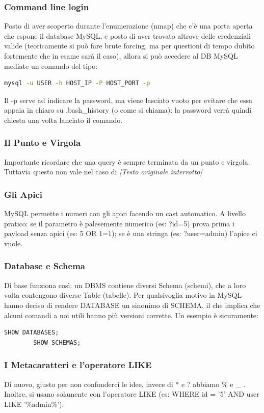 \documentclass[12pt,a4paper]{report}
\begin{document}
	\subsubsection{Command line login}
	Posto di aver scoperto durante l'enumerazione (nmap) che c'è una porta aperta che espone il database MySQL, e posto di aver trovato altrove delle credenziali valide (teoricamente si può fare brute forcing, ma per questioni di tempo dubito fortemente che in esame sarà il caso), allora si può accedere al DB MySQL mediate un comando del tipo:
	\begin{lstlisting}[language=bash]
		mysql -u USER -h HOST_IP -P HOST_PORT -p
	\end{lstlisting}
	Il -p serve ad indicare la password, ma viene lasciato vuoto per evitare che essa appaia in chiaro su .bash\_history (o come si chiama): la password verrà quindi chiesta una volta lanciato il comando.
	
	\subsubsection{Il Punto e Virgola}
	Importante ricordare che una query è sempre terminata da un punto e virgola. Tuttavia questo non vale nel caso di \textit{[Testo originale interrotto]}
	
	\subsubsection{Gli Apici}
	MySQL permette i numeri con gli apici facendo un cast automatico. A livello pratico: se il parametro è palesemente numerico (es: ?id=5) prova prima i payload senza apici (es: 5 OR 1=1); se è una stringa (es: ?user=admin) l'apice ci vuole.
	
	\subsubsection{Database e Schema}
	Di base funziona così: un DBMS contiene diversi Schema (schemi), che a loro volta contengono diverse Table (tabelle). Per qualsivoglia motivo in MySQL hanno deciso di rendere DATABASE un sinonimo di SCHEMA, il che implica che alcuni comandi a noi utili hanno più versioni corrette. Un esempio è sicuramente:
	\begin{lstlisting}[language=SQL]
		SHOW DATABASES;
		SHOW SCHEMAS;
	\end{lstlisting}
	
	\subsubsection{I Metacaratteri e l'operatore LIKE}
	Di nuovo, giusto per non confonderci le idee, invece di * e ? abbiamo \% e \_ . Inoltre, si usano solamente con l'operatore LIKE (es: WHERE id = '5' AND user LIKE '\%admin\%').
	
\end{document}
